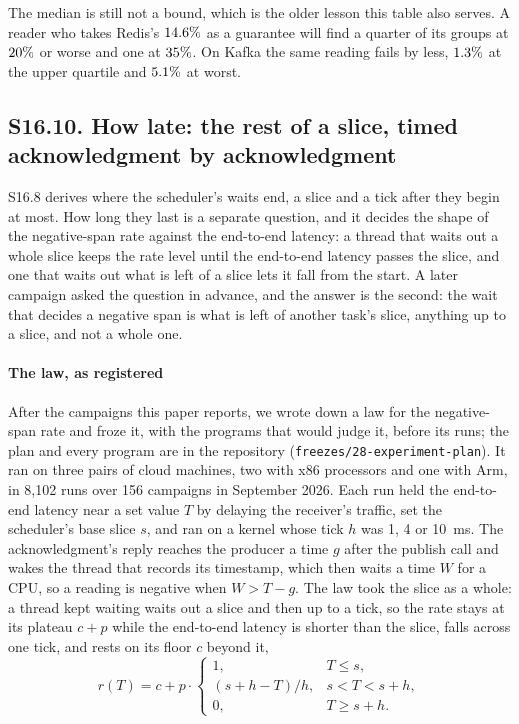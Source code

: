\documentclass[10pt,journal,onecolumn]{IEEEtran}
\newcommand{\kafka}{Kafka}
\newcommand{\redis}{Redis}
\begin{document}
The median is still not a bound, which is the older lesson this table also serves. A reader who
takes \redis{}'s $14.6\%$ as a guarantee will find a quarter of its groups at
$20\%$ or worse and one at $35\%$. On \kafka{} the same reading
fails by less, $1.3\%$ at the upper quartile and $5.1\%$ at worst.

\subsection{S16.10. How late: the rest of a slice, timed acknowledgment by acknowledgment}
\label{sec:restofslice}

S16.8 derives where the scheduler's waits end, a slice and a tick after they begin at most. How
long they last is a separate question, and it decides the shape of the negative-span rate against
the end-to-end latency: a thread that waits out a whole slice keeps the rate level until the end-to-end latency
passes the slice, and one that waits out what is left of a slice lets it fall from the start. A later
campaign asked the question in advance, and the answer is the second: the wait that decides a
negative span is what is left of another task's slice, anything up to a slice, and not a whole
one.

\paragraph{The law, as registered} After the campaigns this paper reports, we wrote down a law
for the negative-span rate and froze it, with the programs that would judge it, before its runs;
the plan and every program are in the repository (\texttt{freezes/28-experiment-plan}). It ran
on three pairs of cloud machines, two with x86 processors and one with Arm, in 8,102 runs over
156 campaigns in September 2026. Each run held the end-to-end latency near a set value $T$ by delaying the
receiver's traffic, set the scheduler's base slice $s$, and ran on a kernel whose tick $h$ was 1,
4 or 10~ms. The acknowledgment's reply reaches the producer a time $g$ after the publish call and wakes
the thread that records its timestamp, which then waits a time $W$ for a CPU, so a reading is
negative when $W > T - g$. The law took the slice as a whole: a thread kept waiting waits out a
slice and then up to a tick, so the rate stays at its plateau $c + p$ while the end-to-end latency
is shorter than the slice, falls across one tick, and rests on its floor $c$ beyond it,
\begin{equation}
\label{eq:planlaw}
r(T) = c + p \cdot \begin{cases} 1, & T \le s,\\ (s + h - T)/h, & s < T < s + h,\\ 0, & T \ge s + h. \end{cases}
\end{equation}
\end{document}
